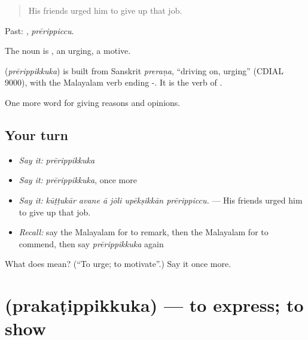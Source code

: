 \begin{quote}
His friends urged him to give up that job.
\end{quote}

Past: , \emph{prērippiccu}.

The noun is , an urging, a motive.

\begin{cousinweb}
\textbf{} (\emph{prērippikkuka}) is built from Sanskrit \emph{preraṇa}, \textquotedblleft{}driving on, urging\textquotedblright{} (CDIAL 9000), with the Malayalam verb ending -. It is the verb of .
\end{cousinweb}

\begin{grammarlens}[title={What you've built}]
One more word for giving reasons and opinions.
\end{grammarlens}

\subsection*{Your turn}
\begin{itemize}
\raggedright
  \item \emph{Say it:} \emph{prērippikkuka}
  \item \emph{Say it:} \emph{prērippikkuka}, once more
  \item \emph{Say it:} \emph{kūṭṭukār avane ā jōli upēkṣikkān prērippiccu.} — His friends urged him to give up that job.
  \item \emph{Recall:} say the Malayalam for to remark, then the Malayalam for to commend, then say \emph{prērippikkuka} again
\end{itemize}

\begin{tcolorbox}[breakable,colback=teal!4,colframe=teal!35!black,title={Before you move on}]
What does  mean? (\textquotedblleft{}To urge; to motivate\textquotedblright{}.) Say it once more.
\end{tcolorbox}
\section[\texorpdfstring{\ml{പ്രകടിപ്പിക്കുക} (prakaṭippikkuka)}{പ്രകടിപ്പിക്കുക (prakaṭippikkuka)}]{ (prakaṭippikkuka) — to express; to show}

\label{lesson:ML-C413-prakatippikkuka}



